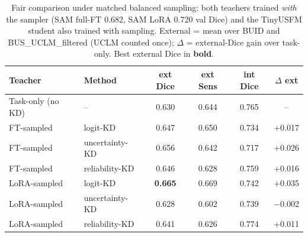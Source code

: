 \begin{table}[t]
\centering
\caption{Fair comparison under matched balanced sampling: both teachers trained
\emph{with} the sampler (SAM full-FT 0.682, SAM LoRA 0.720 val Dice) and the
TinyUSFM student also trained with sampling. External = mean over
BUID and BUS\_UCLM\_filtered (UCLM counted once); $\Delta$ = external-Dice gain over task-only.
Best external Dice in \textbf{bold}.}
\label{tab:kd_sampled_fair}
\begin{tabular}{l l c c c c}
\toprule
Teacher & Method & ext Dice & ext Sens & int Dice & $\Delta$ ext \\
\midrule
Task-only (no KD) & -- & 0.630 & 0.644 & 0.765 & -- \\
FT-sampled & logit-KD & 0.647 & 0.650 & 0.734 & +0.017 \\
FT-sampled & uncertainty-KD & 0.656 & 0.642 & 0.717 & +0.026 \\
FT-sampled & reliability-KD & 0.646 & 0.628 & 0.759 & +0.016 \\
LoRA-sampled & logit-KD & \textbf{0.665} & 0.669 & 0.742 & +0.035 \\
LoRA-sampled & uncertainty-KD & 0.628 & 0.602 & 0.739 & $-$0.002 \\
LoRA-sampled & reliability-KD & 0.641 & 0.626 & 0.774 & +0.011 \\
\bottomrule
\end{tabular}
\end{table}
